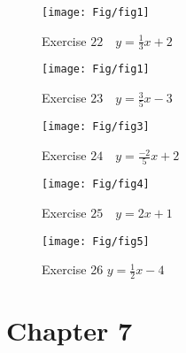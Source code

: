 \documentclass[a4paper]{JAC2003}
\begin{document}
\begin{figure}[H]
\centering
\caption{Exercise $22 \quad y=\frac{1}{3} x+2$}
\texttt{[image: Fig/fig1]}%
\end{figure}

\begin{figure}[H]
\centering
\caption{Exercise $23 \quad y=\frac{3}{5} x-3$}
\texttt{[image: Fig/fig1]}%
\end{figure}

\begin{figure}[H]
\centering
\caption{Exercise $24 \quad y=\frac{-2}{5} x+2$}
\texttt{[image: Fig/fig3]}%
\end{figure}

\begin{figure}[H]
\centering
\caption{Exercise $25 \quad y=2 x+1$}
\texttt{[image: Fig/fig4]}%
\end{figure}


\begin{figure}[H]
\centering
\caption{Exercise 26 $y=\frac{1}{2} x-4$}
\texttt{[image: Fig/fig5]}%
\end{figure}

\section{Chapter 7}
\end{document}
